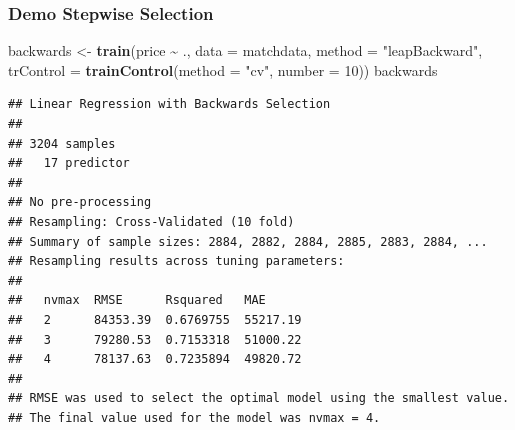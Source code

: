 \documentclass[
  shownotes,
  xcolor={svgnames},
  hyperref={colorlinks,citecolor=DarkBlue,linkcolor=DarkRed,urlcolor=DarkBlue}
  , aspectratio=169]{beamer}
\newenvironment{Shaded}{\begin{snugshade}}{\end{snugshade}}
\newcommand{\DataTypeTok}[1]{\textcolor[rgb]{0.13,0.29,0.53}{#1}}
\newcommand{\DecValTok}[1]{\textcolor[rgb]{0.00,0.00,0.81}{#1}}
\newcommand{\KeywordTok}[1]{\textcolor[rgb]{0.13,0.29,0.53}{\textbf{#1}}}
\newcommand{\NormalTok}[1]{#1}
\newcommand{\OperatorTok}[1]{\textcolor[rgb]{0.81,0.36,0.00}{\textbf{#1}}}
\newcommand{\StringTok}[1]{\textcolor[rgb]{0.31,0.60,0.02}{#1}}
\begin{document}
\begin{frame}[fragile]
\frametitle{Demo Stepwise Selection}

\begin{scriptsize}
\begin{Shaded}
\begin{Highlighting}[]
\NormalTok{backwards \textless{}{-}}\StringTok{ }\KeywordTok{train}\NormalTok{(price }\OperatorTok{\textasciitilde{}}\StringTok{ }\NormalTok{., }\DataTypeTok{data =}\NormalTok{ matchdata,}
              \DataTypeTok{method =} \StringTok{"leapBackward"}\NormalTok{,}
              \DataTypeTok{trControl =} \KeywordTok{trainControl}\NormalTok{(}\DataTypeTok{method =} \StringTok{"cv"}\NormalTok{, }\DataTypeTok{number =} \DecValTok{10}\NormalTok{))}
\NormalTok{backwards}
\end{Highlighting}
\end{Shaded}
\end{scriptsize}
\begin{tiny}
\begin{verbatim}
## Linear Regression with Backwards Selection 
## 
## 3204 samples
##   17 predictor
## 
## No pre-processing
## Resampling: Cross-Validated (10 fold) 
## Summary of sample sizes: 2884, 2882, 2884, 2885, 2883, 2884, ... 
## Resampling results across tuning parameters:
## 
##   nvmax  RMSE      Rsquared   MAE     
##   2      84353.39  0.6769755  55217.19
##   3      79280.53  0.7153318  51000.22
##   4      78137.63  0.7235894  49820.72
## 
## RMSE was used to select the optimal model using the smallest value.
## The final value used for the model was nvmax = 4.
\end{verbatim}
\end{tiny}
\end{frame}
\end{document}
